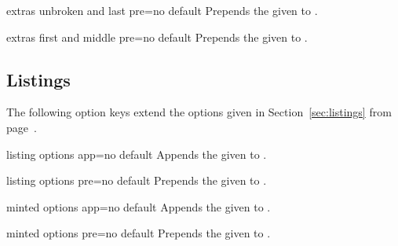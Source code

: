 \begin{docTcbKey}[][doc new=2015-07-16]{extras unbroken and last pre}{=}{no default}
  Prepends the given  to .
\end{docTcbKey}

\begin{docTcbKey}[][doc new=2015-07-16]{extras first and middle pre}{=}{no default}
  Prepends the given  to .
\end{docTcbKey}


\subsection{Listings}
The following option keys extend the options given in
Section~\ref{sec:listings}
from page~\pageref{sec:listings}.


\begin{docTcbKey}[][doc new=2019-07-11]{listing options app}{=}{no default}
  Appends the given  to .
\end{docTcbKey}

\begin{docTcbKey}[][doc new=2019-07-11]{listing options pre}{=}{no default}
  Prepends the given  to .
\end{docTcbKey}

\begin{docTcbKey}[][doc new=2019-07-11]{minted options app}{=}{no default}
  Appends the given  to .
\end{docTcbKey}

\begin{docTcbKey}[][doc new=2019-07-11]{minted options pre}{=}{no default}
  Prepends the given  to .
\end{docTcbKey}


